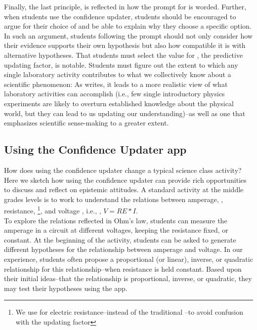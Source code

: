 \documentclass[man, floatsintext]{apa7} %
\begin{document}
Finally, the last principle,  is reflected in how the prompt for  is worded. Further, when students use the confidence updater, students should be encouraged to argue for their choice of  and be able to explain why they choose a specific option. In such an argument, students following the prompt should not only consider how their evidence supports their own hypothesis but also how compatible it is with alternative hypotheses. That students must select the value for , the predictive updating factor, is notable. Students must figure out the extent to which any single laboratory activity contributes to what we collectively know about a scientific phenomenon: As \textcite{warren_quantitative_2018} writes, it leads to a more realistic view of what laboratory activities can accomplish (i.e., few single introductory physics experiments are likely to overturn established knowledge about the physical world, but they can lead to us updating our understanding)--as well as one that emphasizes scientific sense-making to a greater extent. \\

\subsection{Using the Confidence Updater app}

How does using the confidence updater change a typical science class activity? Here we sketch how using the confidence updater can provide rich opportunities to discuss and reflect on epistemic attitudes. A standard activity at the middle grades levels is to work to understand the relations between amperage, , resistance, \footnote{We use  for electric resistance--instead of the traditional --to avoid confusion with the updating factor }, and voltage , i.e., , $V=RE*I$. \\

To explore the relations reflected in Ohm's law, students can measure the amperage in a circuit at different voltages, keeping the resistance fixed, or constant. At the beginning of the activity, students can be asked to generate different hypotheses for the relationship between amperage and voltage. In our experience, students often propose a proportional (or linear), inverse, or quadratic relationship for this relationship--when resistance is held constant. Based upon their initial ideas--that the relationship is proportional, inverse, or quadratic, they may test their hypotheses using the app. \\
\end{document}
